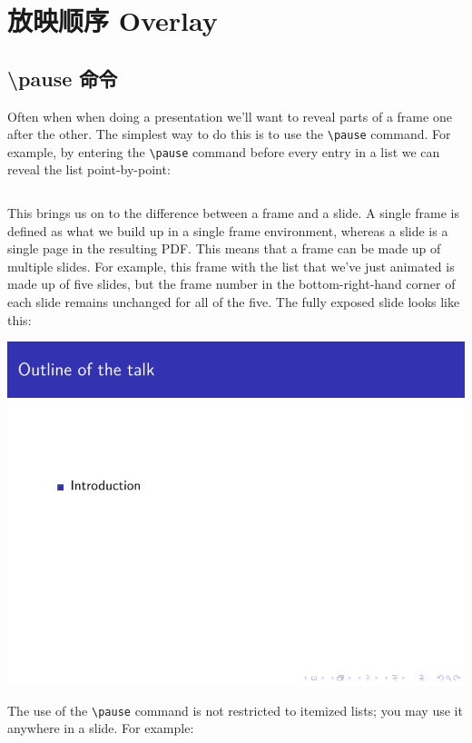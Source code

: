 \begin{column}{0.5\textwidth}
\section{放映顺序 Overlay}

\subsection{{\ttfamily \textbackslash pause} 命令}

Often when when doing a presentation we'll want to reveal parts of a frame one after the other. The simplest way to do this is to use the \verb|\pause| command. For example, by entering the \verb|\pause| command before every entry in a list we can reveal the list point-by-point:

\inputminted[linenos=true]{latex}{examples/beamer/beameroverlay01.tex}

This brings us on to the difference between a frame and a slide. A single frame is defined as what we build up in a single frame environment, whereas a slide is a single page in the resulting PDF. This means that a frame can be made up of multiple slides. For example, this frame with the list that we've just animated is made up of five slides, but the frame number in the bottom-right-hand corner of each slide remains unchanged for all of the five.
The fully exposed slide looks like this:

\includegraphics[page=5]{examples/beamer/beameroverlay01.pdf}

The use of the \verb|\pause| command is not restricted to itemized lists; you may use it anywhere in a slide. For example:


\end{column}
